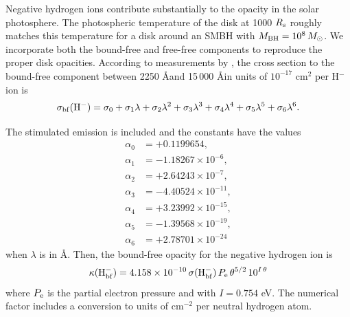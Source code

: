 Negative hydrogen ions contribute substantially to the opacity in the solar photosphere.
The photospheric temperature of the \citet{SirkoGoodman03} disk at 1000 $R_{\rm s}$ roughly matches this temperature for a disk around an SMBH with $M_{\rm BH}=10^8\,M_{\odot}$.
We incorporate both the bound-free and free-free components to reproduce the proper disk opacities.
According to measurements by \citet{Wishart79}, the cross section to the bound-free component between 2250 \AA and 15\,000 \AA in units of $10^{-17}$ cm$^2$ per H$^-$ ion is
\begin{equation}
    \sigma_{\rm bf}(\rm H^-) = \sigma_0 + \sigma_1 \lambda + \sigma_2 \lambda^2 + \sigma_3 \lambda^3 + \sigma_4 \lambda^4 + \sigma_5 \lambda^5 + \sigma_6 \lambda^6.
\end{equation}

The stimulated emission is included and the constants have the values
\begin{align}
    \alpha_0 &= +0.1199654, \\
    \alpha_1 &= -1.18267 \times 10^{-6}, \\
    \alpha_2 &= +2.64243 \times 10^{-7}, \\
    \alpha_3 &= -4.40524 \times 10^{-11}, \\
    \alpha_4 &= +3.23992 \times 10^{-15}, \\
    \alpha_5 &= -1.39568 \times 10^{-19}, \\
    \alpha_6 &= +2.78701 \times 10^{-24}
\end{align}
when $\lambda$ is in \AA.
Then, the bound-free opacity for the negative hydrogen ion is
\begin{equation}
    \kappa({\rm H^-_{bf}}) = 4.158 \times 10^{-10} \, \sigma({\rm H^-_{bf}}) \, P_{\rm e} \, \theta^{5/2} \, 10^{I\, \theta} \\
\end{equation}
where $P_{\rm e}$ is the partial electron pressure and with $I = 0.754$ eV.
The numerical factor includes a conversion to units of cm$^{-2}$ per neutral hydrogen atom.


